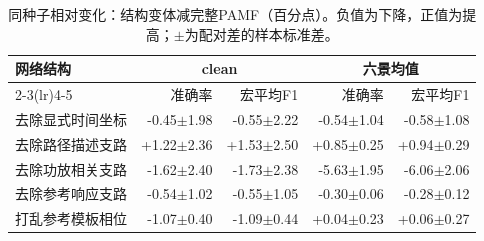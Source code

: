\documentclass[10pt,journal]{IEEEtran}
\begin{document}
\begin{table}[!t]

\caption{同种子相对变化：结构变体减完整PAMF（百分点）。负值为下降，正值为提高；\ensuremath{\pm}为配对差的样本标准差。}

\label{tab:paired}

\centering\small

\begin{tabular*}{\textwidth}{@{\extracolsep{\fill}}lrrrr@{}}

\toprule

网络结构 & \multicolumn{2}{c}{clean} & \multicolumn{2}{c}{六景均值} \\

\cmidrule(lr){2-3}\cmidrule(lr){4-5}

 & 准确率 & 宏平均F1 & 准确率 & 宏平均F1 \\

\midrule

去除显式时间坐标 & \textcolor{loss}{-0.45\ensuremath{\pm}1.98} & \textcolor{loss}{-0.55\ensuremath{\pm}2.22} & \textcolor{loss}{-0.54\ensuremath{\pm}1.04} & \textcolor{loss}{-0.58\ensuremath{\pm}1.08} \\

去除路径描述支路 & \textcolor{gain}{+1.22\ensuremath{\pm}2.36} & \textcolor{gain}{+1.53\ensuremath{\pm}2.50} & \textcolor{gain}{+0.85\ensuremath{\pm}0.25} & \textcolor{gain}{+0.94\ensuremath{\pm}0.29} \\

去除功放相关支路 & \textcolor{loss}{-1.62\ensuremath{\pm}2.40} & \textcolor{loss}{-1.73\ensuremath{\pm}2.38} & \textcolor{loss}{-5.63\ensuremath{\pm}1.95} & \textcolor{loss}{-6.06\ensuremath{\pm}2.06} \\

去除参考响应支路 & \textcolor{loss}{-0.54\ensuremath{\pm}1.02} & \textcolor{loss}{-0.55\ensuremath{\pm}1.05} & \textcolor{loss}{-0.30\ensuremath{\pm}0.06} & \textcolor{loss}{-0.28\ensuremath{\pm}0.12} \\

打乱参考模板相位 & \textcolor{loss}{-1.07\ensuremath{\pm}0.40} & \textcolor{loss}{-1.09\ensuremath{\pm}0.44} & \textcolor{gain}{+0.04\ensuremath{\pm}0.23} & \textcolor{gain}{+0.06\ensuremath{\pm}0.27} \\

\bottomrule

\end{tabular*}

\end{table}
\end{document}
